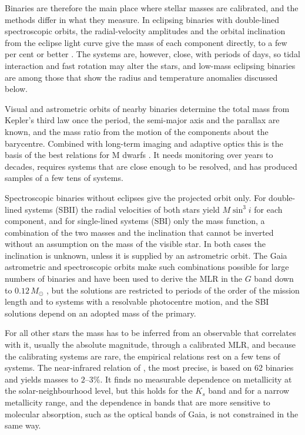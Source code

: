 \documentclass{aa}
\newcommand{\msun}{M_{\odot}}
\begin{document}
Binaries are therefore the main place where stellar masses are calibrated, and the methods differ in what they measure. In eclipsing binaries with double-lined spectroscopic orbits, the radial-velocity amplitudes and the orbital inclination from the eclipse light curve give the mass of each component directly, to a few per cent or better \citep{Torres2010}. The systems are, however, close, with periods of days, so tidal interaction and fast rotation may alter the stars, and low-mass eclipsing binaries are among those that show the radius and temperature anomalies discussed below. 

Visual and astrometric orbits of nearby binaries determine the total mass from Kepler's third law once the period, the semi-major axis and the parallax are known, and the mass ratio from the motion of the components about the barycentre. Combined with long-term imaging and adaptive optics this is the basis of the best relations for M dwarfs \citep{Henry1993,Delfosse2000,Benedict2016,Mann2019}. It needs monitoring over years to decades, requires systems that are close enough to be resolved, and has produced samples of a few tens of systems. 

Spectroscopic binaries without eclipses give the projected orbit only. For double-lined systems (SBII) the radial velocities of both stars yield $M\sin^3 i$ for each component, and for single-lined systems (SBI) only the mass function, a combination of the two masses and the inclination that cannot be inverted without an assumption on the mass of the visible star. In both cases the inclination is unknown, unless it is supplied by an astrometric orbit. The Gaia astrometric and spectroscopic orbits \citep{GaiaCollaboration2023NSS} make such combinations possible for large numbers of binaries and have been used to derive the MLR in the $G$ band down to $0.12\,\msun$ \citep{Chevalier2023}, but the solutions are restricted to periods of the order of the mission length and to systems with a resolvable photocentre motion, and the SBI solutions depend on an adopted mass of the primary.

For all other stars the mass has to be inferred from an observable that correlates with it, usually the absolute magnitude, through a calibrated MLR, and because the calibrating systems are rare, the empirical relations rest on a few tens of systems. The near-infrared relation of \citet{Mann2019}, the most precise, is based on 62 binaries and yields masses to $2$--$3\%$. It finds no measurable dependence on metallicity at the solar-neighbourhood level, but this holds for the $K_s$ band and for a narrow metallicity range, and the dependence in bands that are more sensitive to molecular absorption, such as the optical bands of Gaia, is not constrained in the same way.
\end{document}
